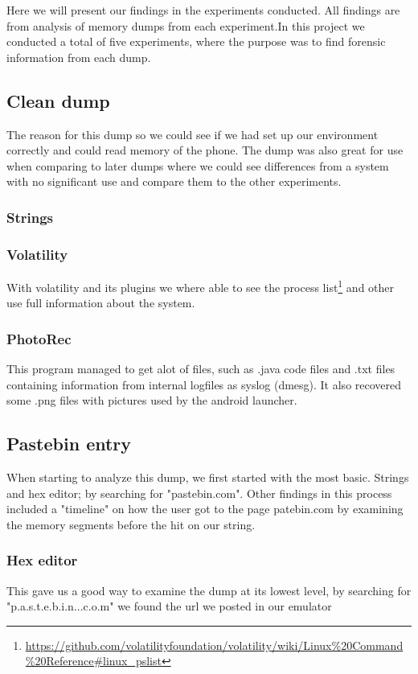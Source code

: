 Here we will present our findings in the experiments conducted. All findings are from analysis of memory dumps from each experiment.In this project we conducted a total of five experiments, where the purpose was to find forensic information from each dump.
\subsection{Clean dump}
The reason for this dump so we could see if we had set up our environment correctly and could read memory of the phone. The dump was also great for use when comparing to later dumps where we could see differences from a system with no significant use and compare them to the other experiments.
\subsubsection{Strings}
\subsubsection{Volatility}
With volatility and its plugins we where able to see the process list\footnote{\url{https://github.com/volatilityfoundation/volatility/wiki/Linux\%20Command\%20Reference\#linux_pslist}} and other use full information about the system.
\subsubsection{PhotoRec}
This program managed to get alot of files, such as .java code files and .txt files containing information from internal logfiles as syslog (dmesg). It also recovered some .png files with pictures used by the android launcher.
\subsection{Pastebin entry}
When starting to analyze this dump, we first started with the most basic. Strings and hex editor; by searching for "pastebin.com". Other findings in this process included a "timeline" on how the user got to the page patebin.com by examining the memory segments before the hit on our string.
\subsubsection{Hex editor}
This gave us a good way to examine the dump at its lowest level, by searching for "p.a.s.t.e.b.i.n...c.o.m" we found the url we posted in our emulator
